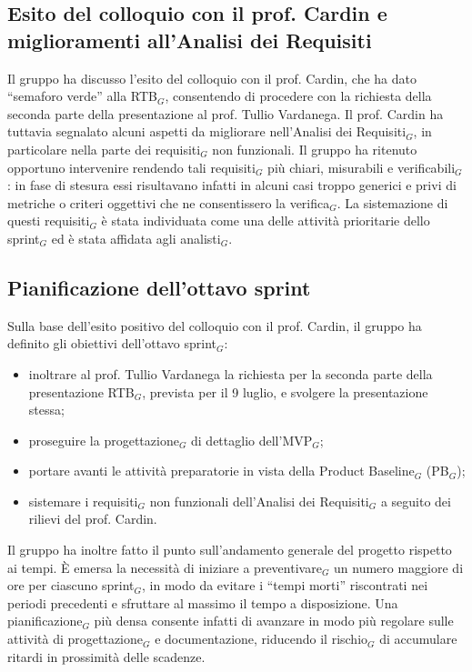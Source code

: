\documentclass[a4paper, 10pt, colorlinks=true, linkcolor=black, urlcolor=blue, citecolor=blue, hidelinks]{article}
\begin{document}
\subsection{Esito del colloquio con il prof. Cardin e miglioramenti all'Analisi dei Requisiti}
Il gruppo ha discusso l'esito del colloquio con il prof. Cardin, che ha dato ``semaforo verde'' alla RTB$_G$, consentendo di procedere con la richiesta della seconda parte della presentazione al prof. Tullio Vardanega. Il prof. Cardin ha tuttavia segnalato alcuni aspetti da migliorare nell'Analisi dei Requisiti$_G$, in particolare nella parte dei requisiti$_G$ non funzionali. Il gruppo ha ritenuto opportuno intervenire rendendo tali requisiti$_G$ più chiari, misurabili e verificabili$_G$: in fase di stesura essi risultavano infatti in alcuni casi troppo generici e privi di metriche o criteri oggettivi che ne consentissero la verifica$_G$. La sistemazione di questi requisiti$_G$ è stata individuata come una delle attività prioritarie dello sprint$_G$ ed è stata affidata agli analisti$_G$.

\subsection{Pianificazione dell'ottavo sprint}
Sulla base dell'esito positivo del colloquio con il prof. Cardin, il gruppo ha definito gli obiettivi dell'ottavo sprint$_G$:
\begin{itemize}
    \item inoltrare al prof. Tullio Vardanega la richiesta per la seconda parte della presentazione RTB$_G$, prevista per il 9 luglio, e svolgere la presentazione stessa;
    \item proseguire la progettazione$_G$ di dettaglio dell'MVP$_G$;
    \item portare avanti le attività preparatorie in vista della Product Baseline$_G$ (PB$_G$);
    \item sistemare i requisiti$_G$ non funzionali dell'Analisi dei Requisiti$_G$ a seguito dei rilievi del prof. Cardin.
\end{itemize}
Il gruppo ha inoltre fatto il punto sull'andamento generale del progetto rispetto ai tempi. È emersa la necessità di iniziare a preventivare$_G$ un numero maggiore di ore per ciascuno sprint$_G$, in modo da evitare i ``tempi morti'' riscontrati nei periodi precedenti e sfruttare al massimo il tempo a disposizione. Una pianificazione$_G$ più densa consente infatti di avanzare in modo più regolare sulle attività di progettazione$_G$ e documentazione, riducendo il rischio$_G$ di accumulare ritardi in prossimità delle scadenze.
\end{document}
